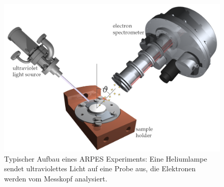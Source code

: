 \begin{figure}[!ht]
    \centering
    \includegraphics[width=0.8\linewidth]{img/1280px-ARPES_setup_-_ultraviolet_source_-_sample_holder_-_electron_analyzer.svg.png}
    \caption{Typischer Aufbau eines ARPES Experiments: Eine Heliumlampe sendet ultraviolettes Licht auf eine Probe aus, die Elektronen werden vom Messkopf analysiert.
    }
    \label{fig:arpes}
\end{figure}

